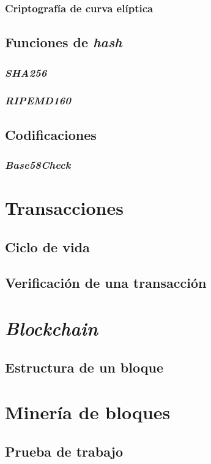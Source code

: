 \subsubsection*{Criptografía de curva elíptica}


\subsection{Funciones de \emph{hash}}
\subsubsection{\emph{SHA256}}
\subsubsection{\emph{RIPEMD160}}

\subsection{Codificaciones}
\subsubsection{\emph{Base58Check}}

\section{Transacciones}
\subsection{Ciclo de vida}
\subsection{Verificación de una transacción}

\section{\emph{Blockchain}}
\subsection{Estructura de un bloque}

\section{Minería de bloques}
\subsection{Prueba de trabajo}




\clearpage
\printbibliography


